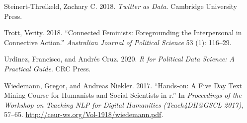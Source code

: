 \documentclass[
]{interact}
\newlength{\cslhangindent}
\newenvironment{CSLReferences}[2] %
 {\begin{list}{}{%
  \setlength{\itemindent}{0pt}
  \setlength{\leftmargin}{0pt}
  \setlength{\parsep}{0pt}
  \ifodd #1
   \setlength{\leftmargin}{\cslhangindent}
   \setlength{\itemindent}{-1\cslhangindent}
  \fi
  \setlength{\itemsep}{#2\baselineskip}}}
 {\end{list}}
\begin{document}
\begin{CSLReferences}{1}{0}
Steinert-Threlkeld, Zachary C. 2018. \emph{Twitter as Data}. Cambridge
University Press.

Trott, Verity. 2018. {``Connected Feminists: Foregrounding the
Interpersonal in Connective Action.''} \emph{Australian Journal of
Political Science} 53 (1): 116--29.

Urdinez, Francisco, and Andrés Cruz. 2020. \emph{R for Political Data
Science: A Practical Guide}. CRC Press.

Wiedemann, Gregor, and Andreas Niekler. 2017. {``Hands-on: A Five Day
Text Mining Course for Humanists and Social Scientists in r.''} In
\emph{Proceedings of the Workshop on Teaching NLP for Digital Humanities
(Teach4DH@GSCL 2017)}, 57--65.
\url{http://ceur-ws.org/Vol-1918/wiedemann.pdf}.

\end{CSLReferences}
\end{document}
